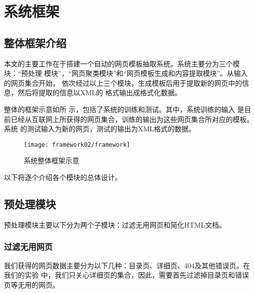 
\chapter{系统框架}
\label{chap:framework}
\section{整体框架介绍}
\label{sec:wholeframework}
本文的主要工作在于搭建一个自动的网页模板抽取系统。系统主要分为三个模块：“预处理
模块”，“网页聚类模块”和“网页模板生成和内容提取模块”。从输入的网页集合开始，
依次经过以上三个模块，生成模板后用于提取新的网页中的信息，然后将提取的信息以XML的
格式输出成格式化数据。

整体的框架示意如所
示，包括了系统的训练和测试。其中，系统训练的输入
是目前已经从互联网上所获得的网页集合，训练的输出为这些网页集合所对应的模板。系统
的测试输入为新的网页，测试的输出为XML格式的数据。

\begin{figure}
  \centering
  \texttt{[image: framework02/framework]}
  \caption{系统整体框架示意}
  \label{framework:fig:framework}
\end{figure}

以下将逐个介绍各个模块的总体设计。
\section{预处理模块}
\label{sec:filterintro}
预处理模块主要以下分为两个子模块：过滤无用网页和简化HTML文档。
\subsection{过滤无用网页}
我们获得的网页数据主要分为以下几种：目录页、详细页、404及其他错误页。在我们的实验
中，我们只关心详细页的集合，因此，需要首先过滤掉目录页和错误页等无用的网页。

